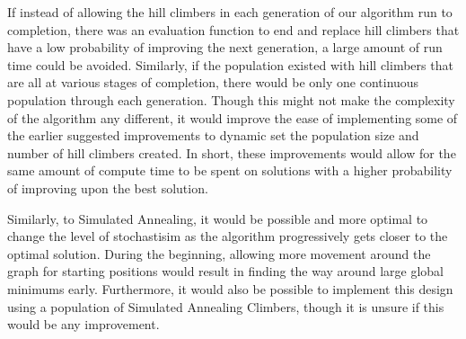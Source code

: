 \documentclass[sigplan,screen]{acmart}
\begin{document}
If instead of allowing the hill climbers in each generation of our algorithm run
to completion, there was an evaluation function to end and replace hill climbers
that have a low probability of improving the next generation, a large amount of
run time could be avoided. Similarly, if the population existed with hill
climbers that are all at various stages of completion, there would be only one
continuous population through each generation. Though this might not make the
complexity of the algorithm any different, it would improve the ease of
implementing some of the earlier suggested improvements to dynamic set the
population size and number of hill climbers created. In short, these
improvements would allow for the same amount of compute time to be spent on
solutions with a higher probability of improving upon the best solution.

Similarly, to Simulated Annealing, it would be possible and more optimal to
change the level of stochastisim as the algorithm progressively gets closer to
the optimal solution. During the beginning, allowing more movement around the
graph for starting positions would result in finding the way around large global
minimums early. Furthermore, it would also be possible to implement this design
using a population of Simulated Annealing Climbers, though it is unsure if this
would be any improvement.



\end{document}
